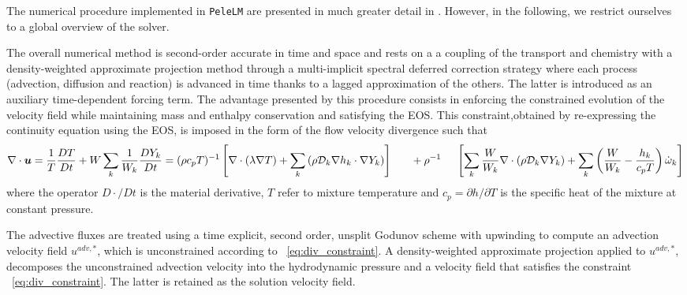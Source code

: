 The numerical procedure implemented in \texttt{PeleLM} are presented in much
greater detail in \cite{nonaka2018conservative}.
%
However, in the following, we restrict ourselves to a global overview of the solver.
% 

The overall numerical method is second-order accurate in time and space and rests on a 
a coupling of the transport and chemistry with a density-weighted approximate projection 
method through a multi-implicit spectral deferred correction strategy \cite{pember1998adaptive,almgren1998conservative, day2000numerical,dutt2000spectral,nonaka2012deferred,pazner2016high, nonaka2018conservative} where each process (advection, diffusion and reaction) is advanced in time
thanks to a lagged approximation of the others.
%
The latter is introduced as an auxiliary time-dependent forcing term.
%
The advantage presented by this procedure consists in enforcing the constrained evolution of the
velocity field while maintaining mass and enthalpy conservation and satisfying the EOS.
%
This constraint,obtained by re-expressing the continuity equation using the EOS, is imposed in
 the form of the flow velocity divergence such that
%
\begin{dmath}
\nabla \cdot \boldsymbol{u} = \frac{1}{T}\frac{DT}{Dt}+ W \sum_k \frac{1}{W_k} \frac{DY_k}{Dt}\\
                            = (\rho c_p T)^{-1}\left[ \nabla \cdot (\lambda \nabla T)
                                                         + \sum_k 
                                                           \left(
                                                                 \rho \mathcal{D}_k
                                                                 \nabla h_k \cdot  \nabla Y_k 
                                                            \right) 
                                                   \right] \\
                           ~~~~~+ \rho^{-1}~~~~ \left[ 
                                    \sum_k \frac{W}{W_k} \nabla \cdot (\rho \mathcal{D}_k \nabla Y_k) +
                                    \sum_k \left(\frac{W}{W_k} - \frac{h_k}{c_p T}\right) \dot{\omega}_k
                               \right]
\label{eq:div_constraint}
\end{dmath}
%
where the operator $D\cdot/Dt$ is the material derivative, $T$ refer to mixture temperature and $c_p=\partial h/\partial T$ is the specific heat of the mixture at constant pressure.


The advective fluxes are treated using a time explicit, second order, unsplit Godunov scheme with
upwinding to compute an advection velocity field $u^{adv,*}$, which is unconstrained according
to ~\eqref{eq:div_constraint}.
%
A density-weighted approximate projection applied to $u^{adv,*}$, decomposes the unconstrained advection
velocity into the hydrodynamic pressure and a velocity field that satisfies the constraint 
~\eqref{eq:div_constraint}.
%
The latter is retained as the solution velocity field.


